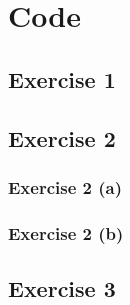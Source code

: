 \documentclass{article}
\begin{document}
\appendix
\section{Code}
\subsection{Exercise 1}
\subsection{Exercise 2}
\subsubsection{Exercise 2 (a)}

\subsubsection{Exercise 2 (b)}

\subsection{Exercise 3}
\end{document}
